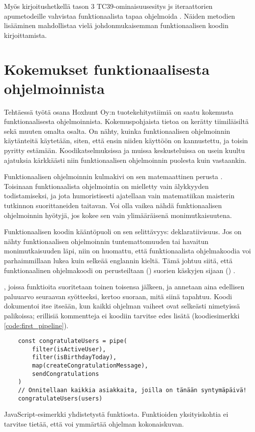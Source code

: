 Myös kirjoitushetkellä tason 3 TC39-ominaisuusesitys \gls{js} iteraattorien apumetodeille vahvistaa funktionaalista tapaa ohjelmoida \cite{tc39_iterator_helpers}. Näiden metodien lisääminen mahdollistaa vielä johdonmukaisemman funktionaalisen koodin kirjoittamista.

\section{Kokemukset funktionaalisesta ohjelmoinnista}

Tehtäessä työtä osana Hoxhunt Oy:n tuotekehitystiimiä on saatu kokemusta funktionaalisesta ohjelmoinnista. Kokemuspohjaista tietoa on kerätty tiimiläisiltä sekä muuten omalta osalta. On nähty, kuinka funktionaalisen ohjelmoinnin käytänteitä käytetään, siten, että ensin niiden käyttöön on kannustettu, ja toisin pyritty estämään. Koodikatselmuksissa ja muissa keskusteluissa on usein kuultu ajatuksia kärkkäästi niin funktionaalisen ohjelmoinnin puolesta kuin vastaankin.

Funktionaalisen ohjelmoinnin kulmakivi on sen matemaattinen perusta \cite{computerphile_lambda,Tan2004}. Toisinaan funktionaalista ohjelmointia on mielletty vain älykkyyden todistamiseksi, ja jota humoristisesti ajatellaan vain matematiikan maisterin tutkinnon suorittaneiden taitavan. Voi olla vaikea nähdä funktionaalisen ohjelmoinnin hyötyjä, jos kokee sen vain ylimääräisenä monimutkaisuutena.

Funktionaalisen koodin kääntöpuoli on sen selittävyys: deklaratiivisuus. Jos on nähty funktionaalisen ohjelmoinnin tuntemattomuuden tai havaitun monimutkaisuuden läpi, niin on huomattu, että funktionaalista ohjelmakoodia voi parhaimmillaan lukea kuin selkeää englannin kieltä. Tämä johtuu siitä, että funktionaalinen ohjelmakoodi on perusteiltaan () suorien käskyjen sijaan () \cite{ms:fp_vs_imperative}.

, joissa funktioita suoritetaan toinen toisensa jälkeen, ja annetaan aina edellisen paluuarvo seuraavan syötteeksi, kertoo suoraan, mitä siinä tapahtuu. Koodi dokumentoi itse itseään, kun kaikki ohjelman vaiheet ovat selkeästi nimetyissä palikoissa; erillisiä kommentteja ei koodiin tarvitse edes lisätä  (koodiesimerkki \ref{code:first_pipeline}).

\begin{code}
    \begin{verbatim}
    const congratulateUsers = pipe(
        filter(isActiveUser),
        filter(isBirthdayToday),
        map(createCongratulationMessage),
        sendCongratulations
    )
    // Onnitellaan kaikkia asiakkaita, joilla on tänään syntymäpäivä!
    congratulateUsers(users)
\end{verbatim}
    \caption{JavaScript-esimerkki yhdistetystä funktiosta. Funktioiden yksityiskohtia ei tarvitse tietää, että voi ymmärtää ohjelman kokonaiskuvan.}

    \label{code:first_pipeline}
\end{code}


